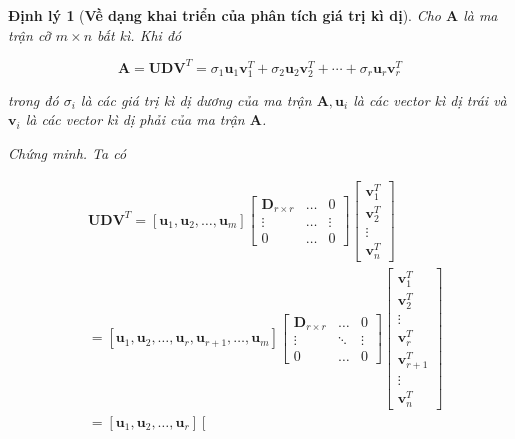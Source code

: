 \documentclass[12pt,a4paper,oneside]{report}
\newtheorem{dl}{Định lý}[section]
\numberwithin{equation}{section}
\begin{document}
\begin{dl}[\textbf{Về dạng khai triển của phân tích giá trị kì dị}] Cho $\mathbf{A}$ là ma trận cỡ $m \times n$ bất kì. Khi đó

$$
\mathbf{A}=\mathbf{U D V}^{T}=\sigma_{1} \mathbf{u}_{1} \mathbf{v}_{1}^{T}+\sigma_{2} \mathbf{u}_{2} \mathbf{v}_{2}^{T}+\cdots+\sigma_{r} \mathbf{u}_{r} \mathbf{v}_{r}^{T}
$$

trong đó $\sigma_{i}$ là các giá trị kì dị dương của ma trận $\mathbf{A}, \mathbf{u}_{i}$ là các vector kì dị trái và $\mathbf{v}_{i}$ là các vector kì dị phải của ma trận $\mathbf{A}$.

Chứng minh. Ta có

$$
\begin{aligned}
	& \mathbf{U D V}^{T}=\left[\mathbf{u}_{1}, \mathbf{u}_{2}, \ldots, \mathbf{u}_{m}\right]\left[\begin{array}{ccc}
		\mathbf{D}_{r \times r} & \ldots & 0 \\
		\vdots & \ldots & \vdots \\
		0 & \ldots & 0
	\end{array}\right]\left[\begin{array}{c}
		\mathbf{v}_{1}^{T} \\
		\mathbf{v}_{2}^{T} \\
		\vdots \\
		\mathbf{v}_{n}^{T}
	\end{array}\right] \\
	& =\left[\mathbf{u}_{1}, \mathbf{u}_{2}, \ldots, \mathbf{u}_{r}, \mathbf{u}_{r+1}, \ldots, \mathbf{u}_{m}\right]\left[\begin{array}{ccc}
		\mathbf{D}_{r \times r} & \ldots & 0 \\
		\vdots & \ddots & \vdots \\
		0 & \ldots & 0
	\end{array}\right]\left[\begin{array}{c}
		\mathbf{v}_{1}^{T} \\
		\mathbf{v}_{2}^{T} \\
		\vdots \\
		\mathbf{v}_{r}^{T} \\
		\mathbf{v}_{r+1}^{T} \\
		\vdots \\
		\mathbf{v}_{n}^{T}
	\end{array}\right] \\
	& \left.=\left[\mathbf{u}_{1}, \mathbf{u}_{2}, \ldots, \mathbf{u}_{r}\right]\left[\begin{array}{ccc}

\end{array}
\end{aligned}$$
\end{dl}
\end{document}
